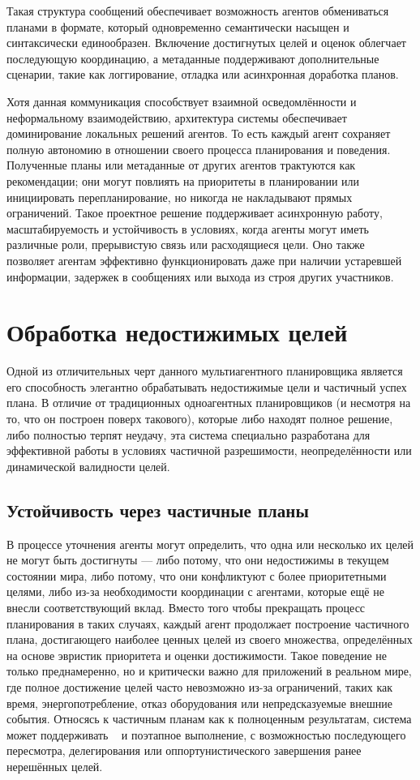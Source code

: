 Такая структура сообщений обеспечивает возможность агентов
обмениваться планами в формате, который одновременно семантически насыщен
и синтаксически единообразен.
Включение достигнутых целей и оценок облегчает последующую координацию,
а метаданные поддерживают дополнительные сценарии, такие как
логгирование, отладка или асинхронная доработка планов.

Хотя данная коммуникация способствует взаимной осведомлённости и неформальному взаимодействию,
архитектура системы обеспечивает доминирование локальных решений агентов.
То есть каждый агент сохраняет полную автономию
в отношении своего процесса планирования и поведения.
Полученные планы или метаданные от других агентов трактуются как рекомендации;
они могут повлиять на приоритеты в планировании или инициировать перепланирование,
но никогда не накладывают прямых ограничений.
Такое проектное решение поддерживает асинхронную работу,
масштабируемость и устойчивость в условиях, когда агенты могут иметь различные роли,
прерывистую связь или расходящиеся цели.
Оно также позволяет агентам эффективно функционировать
даже при наличии устаревшей информации,
задержек в сообщениях или выхода из строя других участников.

\section{Обработка недостижимых целей}

Одной из отличительных черт данного мультиагентного планировщика
является его способность элегантно обрабатывать недостижимые цели и частичный успех плана.
В отличие от традиционных одноагентных планировщиков
(и несмотря на то, что он построен поверх такового),
которые либо находят полное решение, либо полностью терпят неудачу,
эта система специально разработана для эффективной работы в условиях частичной разрешимости,
неопределённости или динамической валидности целей.

\subsection{Устойчивость через частичные планы}

В процессе уточнения агенты могут определить,
что одна или несколько их целей не могут быть достигнуты ---
либо потому, что они недостижимы в текущем состоянии мира,
либо потому, что они конфликтуют с более приоритетными целями,
либо из-за необходимости координации с агентами,
которые ещё не внесли соответствующий вклад.
Вместо того чтобы прекращать процесс планирования в таких случаях,
каждый агент продолжает построение частичного плана,
достигающего наиболее ценных целей из своего множества,
определённых на основе эвристик приоритета и оценки достижимости.
Такое поведение не только преднамеренно,
но и критически важно для приложений в реальном мире,
где полное достижение целей часто невозможно
из-за ограничений, таких как время, энергопотребление, отказ оборудования
или непредсказуемые внешние события.
Относясь к частичным планам как к полноценным результатам,
система может поддерживать ~\cite{BENTON2009562} и поэтапное выполнение,
с возможностью последующего пересмотра, делегирования
или оппортунистического завершения ранее нерешённых целей.

